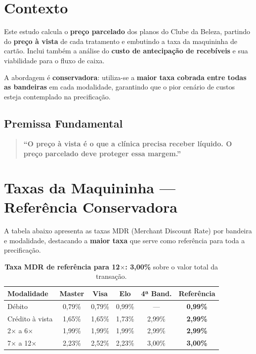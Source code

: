 \documentclass[12pt, a4paper]{article}
\begin{document}
\section{Contexto}

Este estudo calcula o \textbf{preço parcelado} dos planos do Clube da Beleza, partindo do \textbf{preço à vista} de cada tratamento e embutindo a taxa da maquininha de cartão. Inclui também a análise do \textbf{custo de antecipação de recebíveis} e sua viabilidade para o fluxo de caixa.

A abordagem é \textbf{conservadora}: utiliza-se a \textbf{maior taxa cobrada entre todas as bandeiras} em cada modalidade, garantindo que o pior cenário de custos esteja contemplado na precificação.

\subsection{Premissa Fundamental}

\begin{quote}
\textcolor{primaryColor}{\textbf{``O preço à vista é o que a clínica precisa receber líquido. O preço parcelado deve proteger essa margem.''}}
\end{quote}

\needspace{8cm}

\section{Taxas da Maquininha — Referência Conservadora}

A tabela abaixo apresenta as taxas MDR (Merchant Discount Rate) por bandeira e modalidade, destacando a \textbf{maior taxa} que serve como referência para toda a precificação.

\begin{table}[H]
    \centering
    \renewcommand{\arraystretch}{1.4}
    \begin{tabularx}{\textwidth}{X c c c c c}
        \toprule
        \rowcolor{tableHeader} \textbf{Modalidade} & \textbf{Master} & \textbf{Visa} & \textbf{Elo} & \textbf{4ª Band.} & \textbf{Referência} \\
        \midrule
        Débito & 0,79\% & 0,79\% & 0,99\% & — & \textbf{0,99\%} \\
        \rowcolor{lightGray}
        Crédito à vista & 1,65\% & 1,65\% & 1,73\% & 2,99\% & \textbf{2,99\%} \\
        2$\times$ a 6$\times$ & 1,99\% & 1,99\% & 1,99\% & 2,99\% & \textbf{2,99\%} \\
        \rowcolor{lightGray}
        7$\times$ a 12$\times$ & 2,23\% & 2,52\% & 2,23\% & 3,00\% & \textbf{3,00\%} \\
        \bottomrule
    \end{tabularx}
    \caption*{\footnotesize \textbf{Taxa MDR de referência para 12$\times$: 3,00\%} sobre o valor total da transação.}
\end{table}
\end{document}
